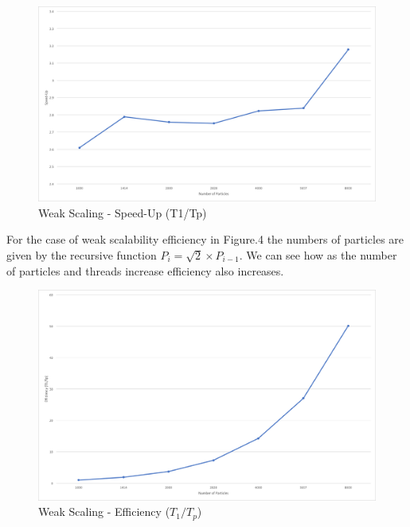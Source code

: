 \documentclass[12pt]{article} %
\begin{document}
\begin{figure}[htb]
\caption{Weak Scaling - Speed-Up (T1/Tp)}\label{fig:benchmark02}
\centering
\includegraphics[width=\textwidth,keepaspectratio]{imgs/img03.png}
\end{figure}

\newpage

For the case of weak scalability efficiency in Figure.4 the numbers of particles are given by the recursive function $ P_i = \sqrt{2} \times P_{i-1} $. We can see how as the number of particles and threads increase efficiency also increases.

\begin{figure}[htb]
\caption{Weak Scaling - Efficiency ($T_1/T_p$)}\label{fig:benchmark02}
\centering
\includegraphics[width=\textwidth,keepaspectratio]{imgs/img04.png}
\end{figure}


\end{document}
